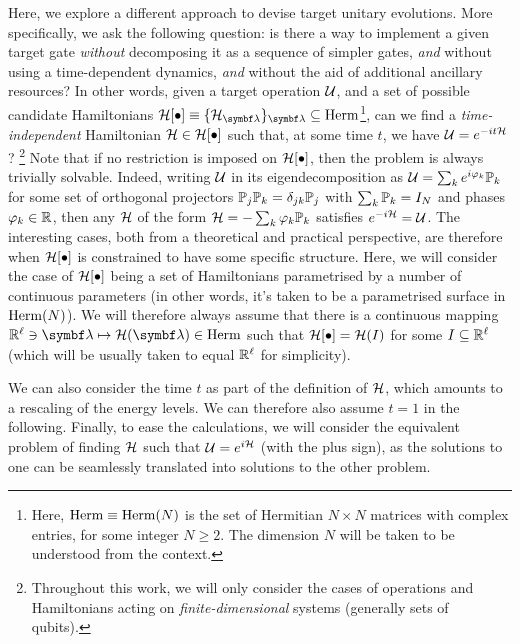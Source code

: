 Here, we explore a different approach to devise target unitary evolutions. More specifically, we ask the following question: is there a way to implement a given target gate \textit{without} decomposing it as a sequence of simpler gates, \textit{and} without using a time-dependent dynamics, \textit{and} without the aid of additional ancillary resources?
In other words, given a target operation ${\mathcal{U}}$, and a set of possible candidate Hamiltonians $\calH[\bullet]\equiv \{\calH_{\bs\lambda}\}_{\bs\lambda}\subseteq\on{Herm}$\footnote{Here, $\operatorname{Herm}\equiv\operatorname{Herm}(N)$ is the set of Hermitian $N\times N$ matrices with complex entries, for some integer $N\ge2$. The dimension $N$ will be taken to be understood from the context.},
can we find a \textit{time-independent} Hamiltonian ${\mathcal{H}}\in{\mathcal{H}}[\bullet]$ such that, at some time $t$, we have ${\mathcal{U}} = e^{-it {\mathcal{H}}}$?
\footnote{Throughout this work, we will only consider the cases of operations and Hamiltonians acting on \textit{finite-dimensional} systems (generally sets of qubits).}
Note that if no restriction is imposed on ${\mathcal{H}}[\bullet]$, then the problem is always trivially solvable. Indeed, writing ${\mathcal{U}}$ in its eigendecomposition as
${\mathcal{U}}=\sum_k e^{i\varphi_k}\mathbb{P}_k$ for some set of orthogonal projectors $\mathbb{P}_j\mathbb{P}_k=\delta_{jk}\mathbb{P}_j$ with $\sum_k\mathbb{P}_k=I_N$ and phases $\varphi_k\in\mathbb{R}$, then any ${\mathcal{H}}$ of the form
${\mathcal{H}} = -\sum_k \varphi_k\mathbb P_k$ satisfies $e^{-i{\mathcal{H}}}=\cal U$.
The interesting cases, both from a theoretical and practical perspective, are therefore when ${\mathcal{H}}[\bullet]$ is constrained to have some specific structure.
Here, we will consider the case of ${\mathcal{H}}[\bullet]$ being a set of Hamiltonians parametrised by a number of continuous parameters (in other words, it's taken to be a parametrised surface in $\operatorname{Herm}(N)$).
We will therefore always assume that there is a continuous mapping $\RR^\ell\ni\bs\lambda\mapsto\calH(\bs\lambda)\in\on{Herm}$ such that ${\mathcal{H}}[\bullet]={\mathcal{H}}(I)$ for some $I\subseteq\mathbb{R}^\ell$ (which will be usually taken to equal $\mathbb{R}^\ell$ for simplicity).

We can also consider the time $t$ as part of the definition of ${\mathcal{H}}$, which amounts to a rescaling of the energy levels. We can therefore also assume $t=1$ in the following. Finally, to ease the calculations, we will consider the equivalent problem of finding ${\mathcal{H}}$ such that ${\mathcal{U}}=e^{i\cal H}$ (with the plus sign), as the solutions to one can be seamlessly translated into solutions to the other problem.


